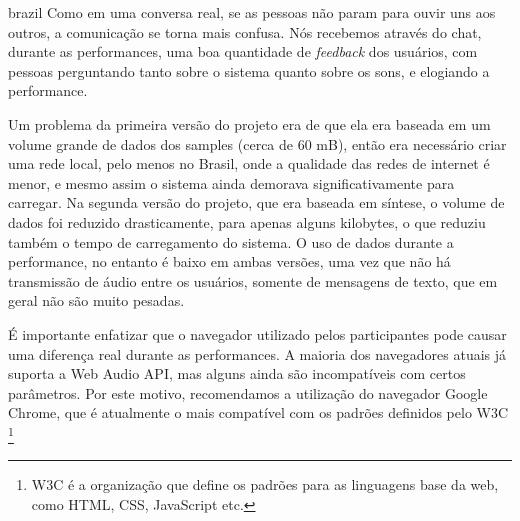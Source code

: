 \begin{otherlanguage*}{brazil}
Como em uma conversa real, se as pessoas não param para ouvir uns aos outros, a comunicação se torna mais confusa. Nós recebemos através do chat, durante as performances, uma boa quantidade de \emph{feedback} dos usuários, com pessoas perguntando tanto sobre o sistema quanto sobre os sons, e elogiando a performance.



Um problema da primeira versão do projeto era de que ela era baseada em um volume grande de dados dos samples (cerca de 60 mB), então era necessário criar uma rede local, pelo menos no Brasil, onde a qualidade das redes de internet é menor, e mesmo assim o sistema ainda demorava significativamente para carregar. Na segunda versão do projeto, que era baseada em síntese, o volume de dados foi reduzido drasticamente, para apenas alguns kilobytes, o que reduziu também o tempo de carregamento do sistema. O uso de dados durante a performance, no entanto é baixo em ambas versões, uma vez que não há transmissão de áudio entre os usuários, somente de mensagens de texto, que em geral não são muito pesadas. 


É importante enfatizar que o navegador utilizado pelos participantes pode causar uma diferença real durante as performances. A maioria dos navegadores atuais já suporta a Web Audio API, mas alguns ainda são incompatíveis com certos parâmetros. Por este motivo, recomendamos a utilização do navegador Google Chrome, que é atualmente o mais compatível com os padrões definidos pelo W3C \footnote{W3C é a organização que define os padrões para as linguagens base da web, como HTML, CSS, JavaScript etc.}



\end{otherlanguage*}
